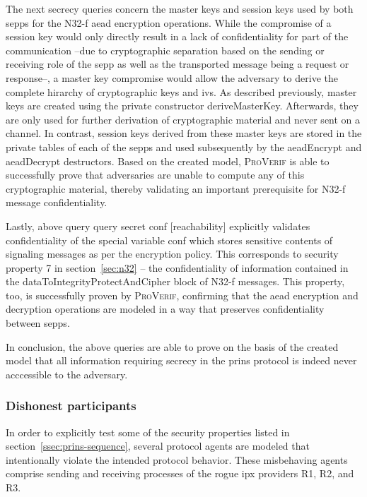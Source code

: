 The next secrecy queries concern the master keys and session keys used by both \glspl{sepp} for the N32-f \gls{aead} encryption operations.
While the compromise of a session key would only directly result in a lack of confidentiality for part of the communication --due to cryptographic separation based on the sending or receiving role of the \gls{sepp} as well as the transported message being a request or response--, a master key compromise would allow the adversary to derive the complete hirarchy of cryptographic keys and \glspl{iv}.
As described previously, master keys are created using the private constructor {\sffamily deriveMasterKey}.
Afterwards, they are only used for further derivation of cryptographic material and never sent on a channel.
In contrast, session keys derived from these master keys are stored in the private tables of each of the \glspl{sepp} and used subsequently by the {\sffamily aeadEncrypt} and {\sffamily aeadDecrypt} destructors.
Based on the created model, \textsc{ProVerif} is able to successfully prove that adversaries are unable to compute any of this cryptographic material, thereby validating an important prerequisite for N32-f message confidentiality.

Lastly, above query {\sffamily query secret conf [reachability]} explicitly validates confidentiality of the special variable {\sffamily conf} which stores sensitive contents of signaling messages as per the encryption policy.
This corresponds to security property 7 in section~\ref{sec:n32} -- the confidentiality of information contained in the {\sffamily dataToIntegrityProtectAndCipher} block of N32-f messages.
This property, too, is successfully proven by \textsc{ProVerif}, confirming that the \gls{aead} encryption and decryption operations are modeled in a way that preserves confidentiality between \glspl{sepp}.

In conclusion, the above queries are able to prove on the basis of the created model that all information requiring secrecy in the \gls{prins} protocol is indeed never acccessible to the adversary.

\subsubsection{Dishonest participants}

In order to explicitly test some of the security properties listed in section~\ref{ssec:prins-sequence}, several protocol agents are modeled that intentionally violate the intended protocol behavior.
These misbehaving agents comprise sending and receiving processes of the rogue \gls{ipx} providers R1, R2, and R3.

